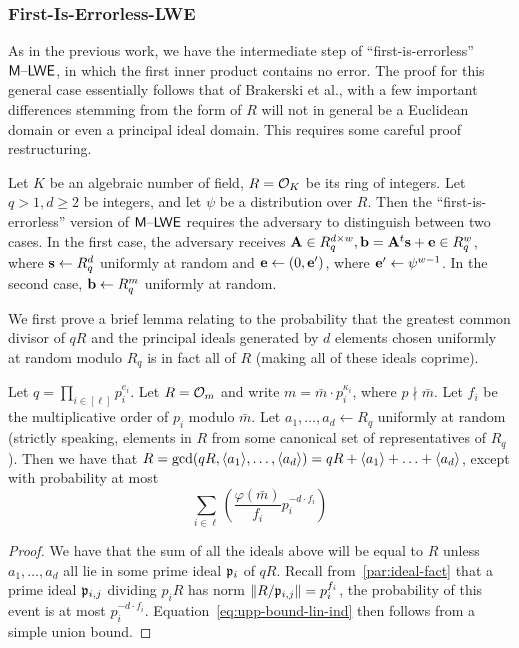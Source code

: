 \subsubsection{First-Is-Errorless-LWE}
\label{sec:first-errorless-lwe}

As in the previous work, we have the intermediate step of
``first-is-errorless'' $\mathsf{M \text{\textendash} LWE}$, in which the first inner product
contains no error. The proof for this general case essentially follows
that of Brakerski et al., with a few important differences stemming
from the form of $R$ will not in general be a Euclidean domain or
even a principal ideal domain. This requires some careful proof
restructuring.
\begin{definition}\label{def:first-errorless-mlwe}
  Let $K$ be an algebraic number of field, $R=\mathcal{O}_{K}$ be its ring of
  integers. Let $q>1,d\geq 2$ be integers, and let $\psi$ be a
  distribution over $R$. Then the
  ``first-is-errorless'' version of $\mathsf{M \text{\textendash} LWE}$ requires the adversary to
  distinguish between two cases. In the first case, the adversary
  receives $\mathbf{A} \in R_q^{d \times w},\mathbf{b} = \mathbf{A}^t\mathbf{s}+\mathbf{e} \in
  R_q^w$, where $\mathbf{s} \gets R_q^d$ uniformly at
  random and $\mathbf{e} \gets (0, \mathbf{e}')$, where $\mathbf{e}' \gets
  \psi^{w-1}$.  In the second case, $\mathbf{b} \gets R_q^m$ uniformly at random.
\end{definition}

We first prove a brief lemma relating to the probability that the
greatest common divisor of $qR$ and the 
principal ideals generated  by $d$
elements chosen uniformly at random modulo $R_q$  is in fact all of
$R$ (making all of these ideals coprime). 
\begin{lemma}\label{lem:prob-relprime}
Let $q=\prod_{i \in
    [\ell]}p_i^{e_i}$. Let $R=\mathcal{O}_{m}$ and write $m=\bar{m}\cdot
  p_i^{\kappa_i}$, where $p \nmid \bar{m}$. Let $f_i$ be the
  multiplicative order of $p_i$ modulo $\bar{m}$. Let $a_1, \ldots,
  a_d \gets R_q$ uniformly at random (strictly speaking, elements in
  $R$ from
  some canonical set of representatives of $R_q$). Then we have that 
$R=\gcd(qR,\langle a_1\rangle,\ldots,\langle a_d\rangle)=qR+\langle a_1\rangle+\ldots+\langle a_d\rangle$,
except with probability at most
\begin{equation}
\label{eq:upp-bound-lin-ind}\sum_{i \in
  \ell}\left(\frac{\varphi(\bar{m})}{f_i}p_i^{-d\cdot f_i} \right)
\end{equation}
\end{lemma}
\begin{proof}
  We have that the sum of all the ideals above will be equal to $R$
  unless $a_1, \ldots, a_d$ all lie in some prime ideal $\mathfrak{p}_i$ of
  $qR$.  Recall from~\ref{par:ideal-fact} that a prime ideal
  $\mathfrak{p}_{i,j}$ dividing $p_iR$ has norm
  $\lVert R/\mathfrak{p}_{i,j}\rVert=p_i^{f_i}$, the probability of this event
  is at most $p_i^{-d\cdot f_i}$. Equation~\ref{eq:upp-bound-lin-ind}
  then follows from a simple union bound.
\end{proof}



